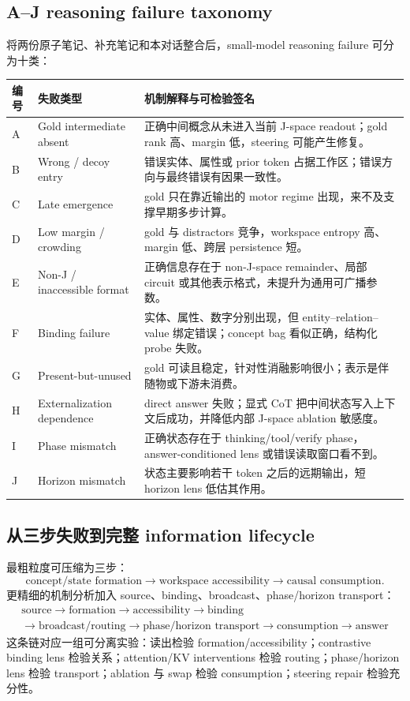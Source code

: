 \documentclass[10.5pt,a4paper]{ctexart}
\begin{document}
\subsection{A--J reasoning failure taxonomy}
将两份原子笔记、补充笔记和本对话整合后，small-model reasoning failure 可分为十类：
\begin{longtable}{p{}p{}p{}}
\toprule
编号 & 失败类型 & 机制解释与可检验签名 \\
\midrule
A & Gold intermediate absent & 正确中间概念从未进入当前 J-space readout；gold rank 高、margin 低，steering 可能产生修复。 \\
B & Wrong / decoy entry & 错误实体、属性或 prior token 占据工作区；错误方向与最终错误有因果一致性。 \\
C & Late emergence & gold 只在靠近输出的 motor regime 出现，来不及支撑早期多步计算。 \\
D & Low margin / crowding & gold 与 distractors 竞争，workspace entropy 高、margin 低、跨层 persistence 短。 \\
E & Non-J / inaccessible format & 正确信息存在于 non-J-space remainder、局部 circuit 或其他表示格式，未提升为通用可广播参数。 \\
F & Binding failure & 实体、属性、数字分别出现，但 entity--relation--value 绑定错误；concept bag 看似正确，结构化 probe 失败。 \\
G & Present-but-unused & gold 可读且稳定，针对性消融影响很小；表示是伴随物或下游未消费。 \\
H & Externalization dependence & direct answer 失败；显式 CoT 把中间状态写入上下文后成功，并降低内部 J-space ablation 敏感度。 \\
I & Phase mismatch & 正确状态存在于 thinking/tool/verify phase，answer-conditioned lens 或错误读取窗口看不到。 \\
J & Horizon mismatch & 状态主要影响若干 token 之后的远期输出，短 horizon lens 低估其作用。 \\
\bottomrule
\end{longtable}

\subsection{从三步失败到完整 information lifecycle}
最粗粒度可压缩为三步：
\[
\text{concept/state formation}
\rightarrow
\text{workspace accessibility}
\rightarrow
\text{causal consumption}.
\]
更精细的机制分析加入 source、binding、broadcast、phase/horizon transport：
\[
\boxed{
\begin{gathered}
\text{source}\rightarrow\text{formation}\rightarrow\text{accessibility}\rightarrow\text{binding}\\
\rightarrow\text{broadcast/routing}\rightarrow\text{phase/horizon transport}\rightarrow\text{consumption}\rightarrow\text{answer}
\end{gathered}}
\]
这条链对应一组可分离实验：读出检验 formation/accessibility；contrastive binding lens 检验关系；attention/KV interventions 检验 routing；phase/horizon lens 检验 transport；ablation 与 swap 检验 consumption；steering repair 检验充分性。
\end{document}
